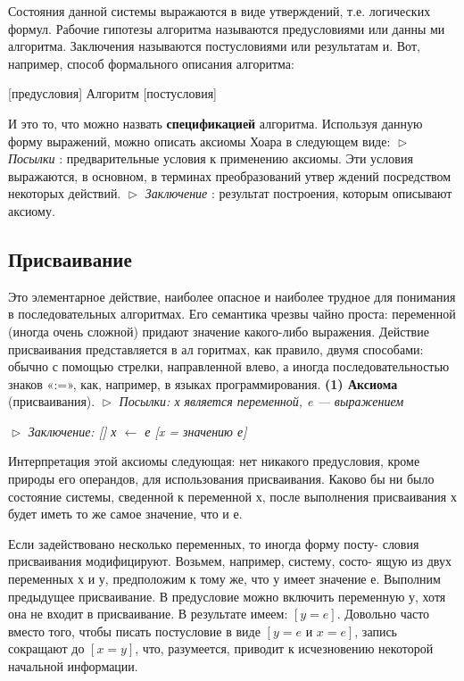 Состояния данной системы выражаются в виде утверждений, т.е.
логических формул. Рабочие гипотезы алгоритма называются
предусловиями или данны ми алгоритма. Заключения называются
постусловиями или результатам и. Вот, например, способ
формального описания алгоритма:
\begin{center}
[предусловия] Алгоритм [постусловия]
\end{center}
И это то, что можно назвать \textbf{спецификацией} алгоритма. Используя 
данную форму выражений, можно описать аксиомы Хоара в следующем 
виде:
\newline
\noindent $\vartriangleright$ \textit{Посылки} : предварительные условия к применению аксиомы. Эти 
условия  выражаются,  в  основном,  в  терминах  преобразований  утвер­
ждений посредством некоторых действий.
\newline
$\vartriangleright$ \textit{Заключение} : результат построения, которым описывают аксиому.
\subsection{Присваивание}
\noindent Это элементарное  действие,  наиболее опасное  и  наиболее трудное  для 
понимания  в  последовательных  алгоритмах.  Его  семантика  чрезвы­
чайно  проста:  переменной  (иногда очень  сложной)  придают  значение 
какого-либо выражения.  Действие  присваивания  представляется  в  ал­
горитмах, как правило, двумя способами: обычно с помощью стрелки, 
направленной  влево,  а  иногда  последовательностью  знаков  «:=»,  как, 
например, в языках программирования.
\newline
\textbf{(1) Аксиома} (присваивания).
\newline
$\vartriangleright$ \textit{Посылки: х является переменной,  e  —  выражением}
\newline

\noindent $\vartriangleright$ \textit{Заключение: [] х $\leftarrow$ е [x = значению е]}
\pagebreak

Интерпретация  этой  аксиомы  следующая:  нет  никакого  предусло­вия,  кроме  природы  его  операндов,  для  использования  присваивания. 
Каково  бы  ни  было состояние  системы,  сведенной  к  переменной х,  по­сле выполнения присваивания х будет иметь то же самое значение,  что и е.

Если задействовано несколько переменных,  то иногда форму посту-
­словия  присваивания  модифицируют.  Возьмем,  например,  систему,  
со­сто-
ящую  из  двух  переменных х  и у,  предположим  к  тому  же,  что у
имеет значение  е.  Выполним предыдущее  присваивание. В предусловие 
можно включить  переменную у,  хотя она не  входит в присваивание.  В 
результате имеем: $[y = e]$. Довольно часто вместо того, чтобы писать 
постусловие  в  виде  $[y = e \text{ и } x = e]$,  запись  сокращают  до  $[x = y]$, 
 что, разумеется,  приводит  к  исчезновению  некоторой  начальной  информа­ции.
 
